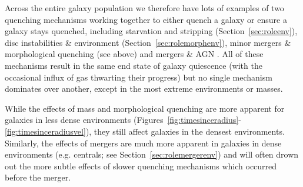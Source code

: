 \documentclass[useAMS,usenatbib]{mn2e}
\begin{document}
Across the entire galaxy population we therefore have lots of examples of two quenching mechanisms working together to either quench a galaxy or ensure a galaxy stays quenched, including starvation and stripping (Section~\ref{sec:roleenv}), disc instabilities \&  environment (Section~\ref{sec:rolemorphenv}), minor mergers \& morphological quenching (see above) and mergers \& AGN \citep{smethurst15, smethurst16}. All of these mechanisms result in the same end state of galaxy quiescence (with the occasional influx of gas thwarting their progress) but no single mechanism dominates over another, except in the most extreme environments or masses. 

While the effects of mass and morphological quenching are more apparent for galaxies in less dense environments (Figures~\ref{fig:timesinceradius}-\ref{fig:timesinceradiusvel}), they still affect galaxies in the densest environments. Similarly, the effects of mergers are much more apparent in galaxies in dense environments (e.g. centrals; see Section~\ref{sec:rolemergerenv}) and will often drown out the more subtle effects of slower quenching mechanisms which occurred before the merger. %

\end{document}
